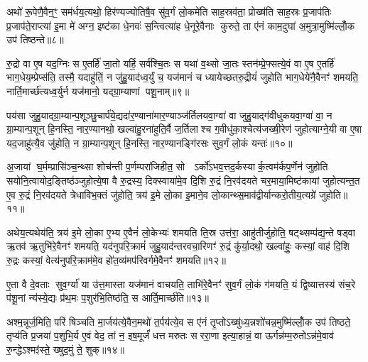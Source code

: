 अथो॑ रू॒पेणै॒वैन॒ꣳ॒ सम॑र्धय॒त्यथो॒ हिर॑ण्यज्योतिषै॒व सु॑व॒र्गं लो॒कमे॑ति साह॒स्रव॑ता॒ प्रोख्ष॑ति साह॒स्रः प्र॒जाप॑तिः प्र॒जाप॑ते॒राप्त्या॑ इ॒मा मे॑ अग्न॒ इष्ट॑का धे॒नवः॑ स॒न्त्वित्या॑ह धे॒नूरे॒वैनाः कुरुते॒ ता ए॑नं काम॒दुघा॑ अ॒मुत्रा॒मुष्मि॑ल्लोँ॒क उप॑ तिष्ठन्ते॥८॥

{\anuvakamend[{सयो॑निमे॒ता वै क॑रो॒त्येका॒न्नच॑त्वारि॒ꣳ॒शच्च॑॥२॥}]}

रु॒द्रो वा ए॒ष यद॒ग्निः स ए॒तर्\mbox{}हि॑ जा॒तो यर्\mbox{}हि॒ सर्व॑श्चि॒तः स यथा॑ व॒थ्सो जा॒तः स्तन॑म्प्रे॒फ्सत्ये॒वं वा ए॒ष ए॒तर्\mbox{}हि॑ भाग॒धेय॒म्प्रेप्स॑ति॒ तस्मै॒ यदाहु॑तिं॒ न जु॑हु॒याद॑ध्व॒र्युं च॒ यज॑मानं च ध्यायेच्छतरु॒द्रीयं॑ जुहोति भाग॒धेये॑नै॒वैनꣳ॑ शमयति॒ नार्ति॒मार्च्छ॑त्यध्व॒र्युर्न यज॑मानो॒ यद्ग्रा॒म्याणां पशू॒नाम्॥९॥

पय॑सा जुहु॒याद्ग्रा॒म्यान्प॒शूञ्छु॒चार्प॑ये॒द्यदा॑र॒ण्याना॑मार॒ण्याञ्ज॑र्तिलयवा॒ग्वा॑ वा जुहु॒याद्ग॑वीधुकयवा॒ग्वा॑ वा॒ न ग्रा॒म्यान्प॒शून् हि॒नस्ति॒ नार॒ण्यानथो॒ खल्वा॑हु॒रना॑हुति॒र्वै ज॒र्तिलाश्च ग॒वीधु॑का॒श्चेत्य॑जख्षी॒रेण॑ जुहोत्याग्ने॒यी वा ए॒षा यद॒जाहु॑त्यै॒व जु॑होति॒ न ग्रा॒म्यान्प॒शून् हि॒नस्ति॒ नार॒ण्यानङ्गि॑रसः सुव॒र्गं लो॒कं यन्तः॑॥१०॥

अ॒जायां घ॒र्मम्प्रासि॑ञ्च॒न्थ्सा शोच॑न्ती प॒र्णम्परा॑जिहीत॒ सो  ऽर्को॑ऽभव॒त्तद॒र्कस्यार्क॒त्वम॑र्कप॒र्णेन॑ जुहोति सयोनि॒त्वायोद॒ङ्तिष्ठ॑ञ्जुहोत्ये॒षा वै रु॒द्रस्य॒ दिक्स्वाया॑मे॒व दि॒शि रु॒द्रं नि॒रव॑दयते चर॒माया॒मिष्ट॑कायां जुहोत्यन्त॒त ए॒व रु॒द्रं नि॒रव॑दयते त्रेधाविभ॒क्तं जु॑होति॒ त्रय॑ इ॒मे लो॒का इ॒माने॒व लो॒कान्थ्स॒माव॑द्वीर्यान्करो॒तीय॒त्यग्रे॑ जुहोति॥११॥

अथेय॒त्यथेय॑ति॒ त्रय॑ इ॒मे लो॒का ए॒भ्य ए॒वैनं॑ लो॒केभ्यः॑ शमयति ति॒स्र उत्त॑रा॒ आहु॑तीर्जुहोति॒ षट्थ्सम्प॑द्य॒न्ते षड्वा ऋ॒तव॑ ऋ॒तुभि॑रे॒वैनꣳ॑ शमयति॒ यद॑नुपरि॒क्रामं॑ जुहु॒याद॑न्तरवचा॒रिणꣳ॑ रु॒द्रं कु॑र्या॒दथो॒ खल्वा॑हुः॒ कस्यां॒ वाह॑ दि॒शि रु॒द्रः कस्यां॒ वेत्य॑नुपरि॒क्राम॑मे॒व हो॑त॒व्य॑मप॑रिवर्गमे॒वैनꣳ॑ शमयति॥१२॥

ए॒ता वै दे॒वताः सुव॒र्ग्या॑ या उ॑त्त॒मास्ता यज॑मानं वाचयति॒ ताभि॑रे॒वैनꣳ॑ सुव॒र्गं लो॒कं ग॑मयति॒ यं द्वि॒ष्यात्तस्य॑ संच॒रे प॑शू॒नां न्य॑स्ये॒द्यः प्र॑थ॒मः प॒शुर॑भि॒तिष्ठ॑ति॒ स आर्ति॒मार्च्छ॑ति॥१३॥

{\anuvakamend[{प॒शू॒नां यन्तोऽग्रे॑ जुहो॒त्यप॑रिवर्गमे॒वैनꣳ॑ शमयति त्रि॒ꣳ॒शच्च॑॥३॥}]}

अश्म॒न्नूर्ज॒मिति॒ परि॑ षिञ्चति मा॒र्जय॑त्ये॒वैन॒मथो॑ त॒र्पय॑त्ये॒व स ए॑नं तृ॒प्तोऽख्षु॑ध्य॒न्नशो॑चन्न॒मुष्मि॑ल्लोँ॒क उप॑ तिष्ठते॒ तृप्य॑ति प्र॒जया॑ प॒शुभि॒र्य ए॒वं वेद॒ तां न॒ इष॒मूर्जं॑ धत्त मरुतः सररा॒णा इत्या॒हान्नं॒ वा ऊर्गन्न॑म्म॒रुतोऽन्न॑मे॒वाव॑ रु॒न्द्धेऽश्मꣵ॑स्ते॒ ख्षुद॒मुं ते॒ शुक्॥१४॥

